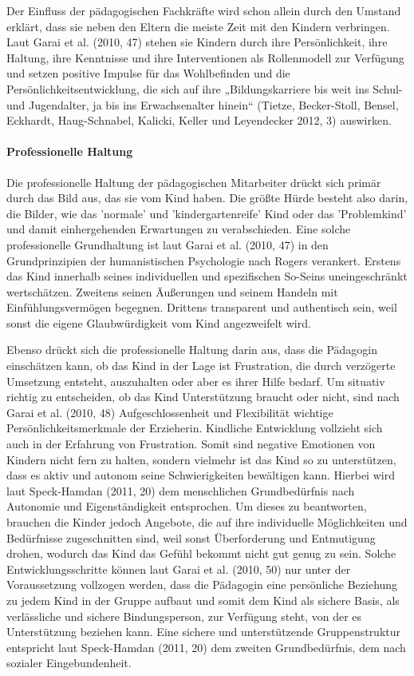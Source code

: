 Der Einfluss der pädagogischen Fachkräfte wird schon allein durch den Umstand erklärt, dass sie neben den Eltern die meiste Zeit mit den Kindern verbringen. Laut Garai et al. (2010, 47) stehen sie Kindern durch ihre Persönlichkeit, ihre Haltung, ihre Kenntnisse und ihre Interventionen als Rollenmodell zur Verfügung und setzen positive Impulse für das Wohlbefinden und die Persönlichkeitsentwicklung, die sich auf ihre „Bildungskarriere bis weit ins Schul- und Jugendalter, ja bis ins Erwachsenalter hinein“ (Tietze, Becker-Stoll, Bensel, Eckhardt, Haug-Schnabel, Kalicki, Keller und Leyendecker 2012, 3) auswirken.  
 
\paragraph{Professionelle Haltung} 
Die professionelle Haltung der pädagogischen Mitarbeiter drückt sich primär durch das Bild aus, das sie vom Kind haben.
Die größte Hürde besteht also darin, die Bilder, wie das 'normale' und 'kindergartenreife' Kind oder das 'Problemkind' und damit einhergehenden Erwartungen zu verabschieden.  
Eine solche professionelle Grundhaltung ist laut Garai et al. (2010, 47) in den Grundprinzipien der humanistischen Psychologie nach Rogers verankert. Erstens das Kind innerhalb seines individuellen und spezifischen So-Seins uneingeschränkt wertschätzen. Zweitens seinen Äußerungen und seinem Handeln mit Einfühlungsvermögen begegnen. Drittens transparent und authentisch sein, weil sonst die eigene Glaubwürdigkeit vom Kind angezweifelt wird.
   
Ebenso drückt sich die professionelle Haltung darin aus, dass die Pädagogin einschätzen kann, ob das Kind in der Lage ist Frustration, die durch verzögerte Umsetzung entsteht, auszuhalten oder aber es ihrer Hilfe bedarf. Um situativ richtig zu entscheiden, ob das Kind Unterstützung braucht oder nicht, sind nach Garai et al. (2010, 48) Aufgeschlossenheit und Flexibilität wichtige Persönlichkeitsmerkmale der Erzieherin. Kindliche Entwicklung vollzieht sich auch in der Erfahrung von Frustration. Somit sind negative Emotionen von Kindern nicht fern zu halten, sondern vielmehr ist das Kind so zu unterstützen, dass es aktiv und autonom seine Schwierigkeiten bewältigen kann.
Hierbei wird laut Speck-Hamdan (2011, 20) dem menschlichen Grundbedürfnis nach Autonomie und Eigenständigkeit entsprochen. Um dieses zu beantworten, brauchen die Kinder jedoch Angebote, die auf ihre individuelle Möglichkeiten und Bedürfnisse zugeschnitten sind, weil sonst Überforderung und Entmutigung drohen, wodurch das Kind das Gefühl bekommt nicht gut genug zu sein. Solche Entwicklungsschritte können laut Garai et al. (2010, 50) nur unter der Voraussetzung vollzogen werden, dass die Pädagogin eine persönliche Beziehung zu jedem Kind in der Gruppe aufbaut und somit dem Kind als sichere Basis, als verlässliche und sichere Bindungsperson, zur Verfügung steht, von der es Unterstützung beziehen kann. Eine sichere und unterstützende Gruppenstruktur entspricht laut Speck-Hamdan (2011, 20) dem zweiten Grundbedürfnis, dem nach sozialer Eingebundenheit. 
   

